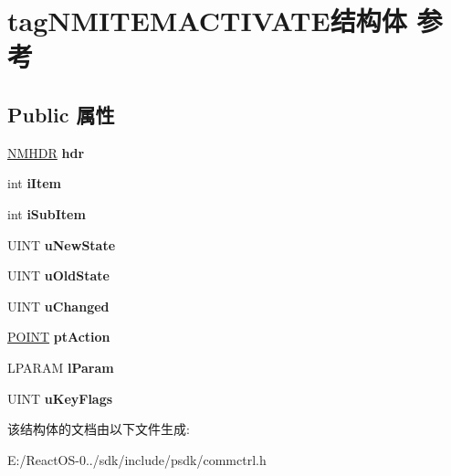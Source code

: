\hypertarget{structtag_n_m_i_t_e_m_a_c_t_i_v_a_t_e}{}\section{tag\+N\+M\+I\+T\+E\+M\+A\+C\+T\+I\+V\+A\+T\+E结构体 参考}
\label{structtag_n_m_i_t_e_m_a_c_t_i_v_a_t_e}
\subsection*{Public 属性}
\begin{DoxyCompactItemize}
\item 
\mbox{\label{structtag_n_m_i_t_e_m_a_c_t_i_v_a_t_e_a3f6e308f13be80971f15b44478ec52fa}} 
\hyperlink{structtag_n_m_h_d_r}{N\+M\+H\+DR} {\bfseries hdr}
\item 
\mbox{\label{structtag_n_m_i_t_e_m_a_c_t_i_v_a_t_e_a162a37001acf29e4e5fe652de3ce7963}} 
int {\bfseries i\+Item}
\item 
\mbox{\label{structtag_n_m_i_t_e_m_a_c_t_i_v_a_t_e_aa5ba857726d5dee6e956d4a392f0f1b1}} 
int {\bfseries i\+Sub\+Item}
\item 
\mbox{\label{structtag_n_m_i_t_e_m_a_c_t_i_v_a_t_e_a58231d0382b79f583587109e015f794f}} 
U\+I\+NT {\bfseries u\+New\+State}
\item 
\mbox{\label{structtag_n_m_i_t_e_m_a_c_t_i_v_a_t_e_a01af6fd90b56b8bb202bc268acf76168}} 
U\+I\+NT {\bfseries u\+Old\+State}
\item 
\mbox{\label{structtag_n_m_i_t_e_m_a_c_t_i_v_a_t_e_a6a01f882e1516f1c8a77ed18bf041857}} 
U\+I\+NT {\bfseries u\+Changed}
\item 
\mbox{\label{structtag_n_m_i_t_e_m_a_c_t_i_v_a_t_e_abef3b51ef2d205c83c9d9c3bc93850cf}} 
\hyperlink{structtag_p_o_i_n_t}{P\+O\+I\+NT} {\bfseries pt\+Action}
\item 
\mbox{\label{structtag_n_m_i_t_e_m_a_c_t_i_v_a_t_e_a80ed08105cc2c70fb71a3ebab55263f6}} 
L\+P\+A\+R\+AM {\bfseries l\+Param}
\item 
\mbox{\label{structtag_n_m_i_t_e_m_a_c_t_i_v_a_t_e_a8851b687f4548ab36586af095113e734}} 
U\+I\+NT {\bfseries u\+Key\+Flags}
\end{DoxyCompactItemize}


该结构体的文档由以下文件生成\+:\begin{DoxyCompactItemize}
\item 
E\+:/\+React\+O\+S-\/0../sdk/include/psdk/commctrl.\+h\end{DoxyCompactItemize}
